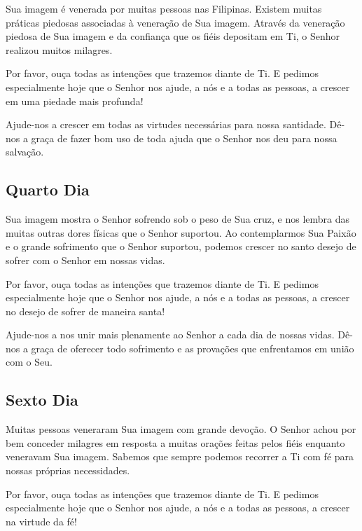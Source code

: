 \documentclass[18pt]{article}
\begin{document}
Sua imagem é venerada por muitas pessoas nas Filipinas. Existem muitas práticas piedosas associadas à veneração de Sua imagem. Através da veneração piedosa de Sua imagem e da confiança que os fiéis depositam em Ti, o Senhor realizou muitos milagres.

Por favor, ouça todas as intenções que trazemos diante de Ti. E pedimos especialmente hoje que o Senhor nos ajude, a nós e a todas as pessoas, a crescer em uma piedade mais profunda!

Ajude-nos a crescer em todas as virtudes necessárias para nossa santidade. Dê-nos a graça de fazer bom uso de toda ajuda que o Senhor nos deu para nossa salvação.

\textbf{}


\subsection{Quarto Dia}
\textbf{}

Sua imagem mostra o Senhor sofrendo sob o peso de Sua cruz, e nos lembra das muitas outras dores físicas que o Senhor suportou. Ao contemplarmos Sua Paixão e o grande sofrimento que o Senhor suportou, podemos crescer no santo desejo de sofrer com o Senhor em nossas vidas.

Por favor, ouça todas as intenções que trazemos diante de Ti. E pedimos especialmente hoje que o Senhor nos ajude, a nós e a todas as pessoas, a crescer no desejo de sofrer de maneira santa!

Ajude-nos a nos unir mais plenamente ao Senhor a cada dia de nossas vidas. Dê-nos a graça de oferecer todo sofrimento e as provações que enfrentamos em união com o Seu.

\textbf{}


\subsection{Sexto Dia}
\textbf{}




Muitas pessoas veneraram Sua imagem com grande devoção. O Senhor achou por bem conceder milagres em resposta a muitas orações feitas pelos fiéis enquanto veneravam Sua imagem. Sabemos que sempre podemos recorrer a Ti com fé para nossas próprias necessidades.

Por favor, ouça todas as intenções que trazemos diante de Ti. E pedimos especialmente hoje que o Senhor nos ajude, a nós e a todas as pessoas, a crescer na virtude da fé!
\end{document}
